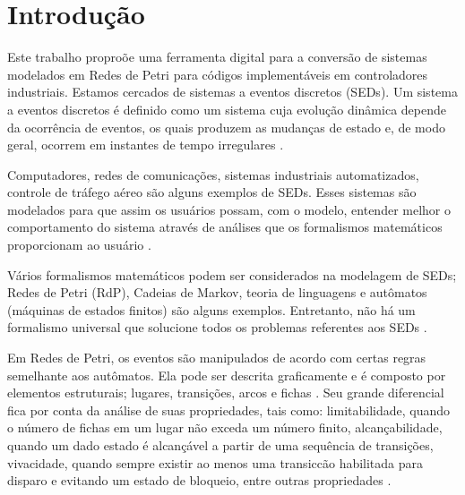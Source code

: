\chapter{Introdu\c{c}\~ao}




Este trabalho propro\~oe uma ferramenta digital para a convers\~ao de sistemas modelados em Redes de Petri para códigos implementáveis em controladores industriais.
Estamos cercados de sistemas a eventos discretos (SEDs). Um sistema a eventos discretos \'e definido como um sistema cuja evolu\c{c}\~ao din\^amica depende da ocorr\^encia de eventos, os quais produzem as mudan\c{c}as de estado e, de modo geral, ocorrem em instantes de tempo irregulares \cite{Montgomery2004}. 

Computadores, redes de comunica\c{c}\~oes, sistemas industriais automatizados, controle de tr\'afego a\'ereo s\~ao alguns exemplos de SEDs. Esses sistemas s\~ao modelados para que assim os usu\'arios possam, com o modelo, entender melhor o comportamento do sistema atrav\'es de an\'alises que os formalismos matem\'aticos proporcionam ao usu\'ario \cite{Wolfgang2013}.


V\'arios formalismos matem\'aticos podem ser considerados na modelagem de SEDs; Redes de Petri (RdP), Cadeias de Markov, teoria de linguagens e aut\^omatos (m\'aquinas de estados finitos) s\~ao alguns exemplos. Entretanto, n\~ao h\'a um formalismo universal que solucione todos os problemas referentes aos SEDs \cite{Montgomery2004}.


Em Redes de Petri, os eventos s\~ao manipulados de acordo com certas regras semelhante aos aut\^omatos. Ela pode ser descrita graficamente e \'e composto por elementos estruturais; lugares, transi\c{c}\~oes, arcos e fichas \cite{Cassandras2008}. Seu grande diferencial fica por conta da an\'alise de suas propriedades, tais como: limitabilidade, quando o n\'umero de fichas em um lugar n\~ao exceda um n\'umero finito, alcan\c{c}abilidade, quando um dado estado \'e alcan\c{c}\'avel a partir de uma sequ\^encia de transi\c{c}\~oes, vivacidade, quando sempre existir ao menos uma transic{c}\~ao habilitada para disparo e evitando um estado de bloqueio, entre outras propriedades \cite{Cassandras2008}.


